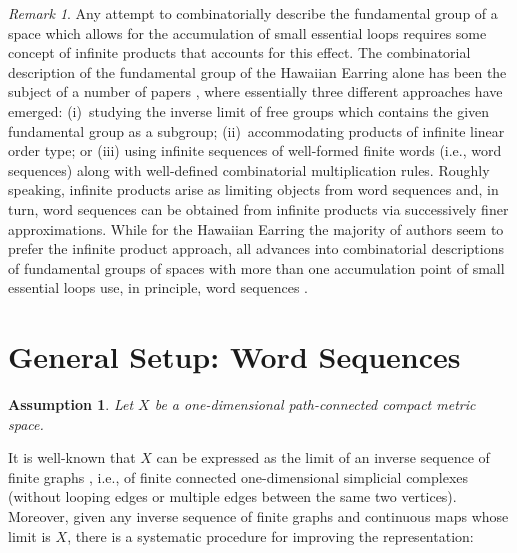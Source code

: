 \documentclass{amsart}
\newtheorem*{assumption}{Assumption}
\theoremstyle{definition}
\theoremstyle{remark}
\newtheorem*{Remark}{Remark}
\numberwithin{equation}{section}
\begin{document}
\begin{Remark}
Any attempt to combinatorially describe the fundamental group of a space which allows for the accumulation of small essential loops requires some concept of infinite products that accounts for this effect.
The combinatorial description of the fundamental group of the Hawaiian Earring alone has been the subject of a number of papers \cite{CC1,E1,MM,Z1}, where essentially three different approaches have emerged:  (i)~studying the inverse limit of free groups which contains the given fundamental group as a subgroup; (ii)~accommodating products of infinite linear order type; or (iii) using infinite sequences of well-formed finite words (i.e., word sequences) along with well-defined combinatorial multiplication rules.
Roughly speaking, infinite products arise as limiting objects from word sequences and, in turn, word sequences can be obtained from infinite products via successively finer approximations.
While for the Hawaiian Earring the majority of authors seem to prefer the infinite product approach, all advances into combinatorial descriptions of fundamental groups of spaces with more than one accumulation point of small essential loops use, in principle, word sequences \cite{ADTW,DS,FZ1,Z2}.
\end{Remark}

\section{General Setup: Word Sequences}\label{words}

\begin{assumption} Let $X$ be a one-dimensional path-connected compact metric space.
\end{assumption}

It is well-known that $X$ can be expressed as the limit of an inverse sequence of finite graphs \cite[Theorem~1]{MS}, i.e., of finite connected one-dimensional simplicial complexes (without looping edges or multiple edges between the same two vertices).  Moreover, given any inverse sequence of finite graphs and continuous maps whose limit is $X$, there is a systematic procedure for improving the representation:
\end{document}
